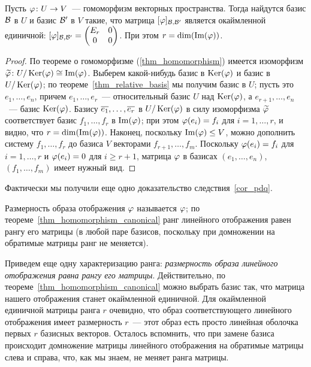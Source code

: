 \begin{theorem}\label{thm_homomorphism_canonical}
Пусть $\varphi\colon U\to V$~--- гомоморфизм векторных пространства. Тогда
найдутся базис $\mathcal B$ в $U$ и базис $\mathcal B'$ в $V$ такие, что матрица
$[\varphi]_{\mathcal B,\mathcal B'}$ является окаймленной единичной:
$[\varphi]_{\mathcal B,\mathcal B'} = \begin{pmatrix}E_r & 0\\0&0\end{pmatrix}$.
При этом $r=\dim(\operatorname{Im}(\varphi))$.
\end{theorem}
\begin{proof}
По теореме о гомоморфизме (\ref{thm_homomorphism}) имеется изоморфизм
$\widetilde{\varphi}\colon U/\operatorname{Ker}(\varphi)\cong\operatorname{Im}(\varphi)$.
Выберем какой-нибудь базис в $\operatorname{Ker}(\varphi)$ и базис в $U/\operatorname{Ker}(\varphi)$; по
теореме~\ref{thm_relative_basis} мы получим базис в $U$; пусть это
$e_1,\dots,e_n$,
причем $e_1,\dots,e_r$~--- относительный базис $U$ над $\operatorname{Ker}(\varphi)$, а
$e_{r+1},\dots,e_n$~--- базис $\operatorname{Ker}(\varphi)$.
Базису $\overline{e_1},\dots,\overline{e_r}$ в $U/\operatorname{Ker}(\varphi)$ в силу
изоморфизма $\widetilde{\varphi}$ соответствует базис $f_1,\dots,f_r$ в
$\operatorname{Im}(\varphi)$; при этом $\varphi(e_i)=f_i$ для $i=1,\dots,r$, и видно, что
$r=\dim(\operatorname{Im}(\varphi))$.
Наконец, поскольку $\operatorname{Im}(\varphi)\leq V$, можно дополнить систему
$f_1,\dots,f_r$ до базиса $V$ векторами $f_{r+1},\dots,f_m$.
Поскольку $\varphi(e_i)=f_i$ для $i=1,\dots,r$ и $\varphi(e_i)=0$ для $i\geq
r+1$, матрица $\varphi$ в базисах $(e_1,\dots,e_n)$, $(f_1,\dots,f_m)$
имеет нужный вид.
\end{proof}

Фактически мы получили еще одно доказательство
следствия~\ref{cor_pdq}.
\begin{remark}\label{rem_rank_homomorphism}
Размерность образа отображения $\varphi$ называется
 $\varphi$; по
теореме~\ref{thm_homomorphism_canonical} ранг линейного отображения
равен рангу его матрицы (в любой паре базисов, поскольку при
домножении на обратимые матрицы ранг не меняется).
\end{remark}

\begin{remark}\label{rem:rank-is-dim-im}
Приведем еще одну характеризацию ранга: {\em размерность образа
линейного отображения равна рангу его матрицы}. Действительно,
по теореме~\ref{thm_homomorphism_canonical} можно выбрать базис так,
что матрица нашего отображения станет окаймленной единичной.
Для окаймленной единичной матрицы ранга $r$ очевидно, что образ
соответствующего линейного отображения имеет размерность $r$~---
этот образ есть просто линейная оболочка первых $r$ базисных векторов.
Осталось вспомнить, что при замене базиса происходит домножение
матрицы линейного отображения на обратимые матрицы слева и справа,
что, как мы знаем, не меняет ранга матрицы. 
\end{remark}

